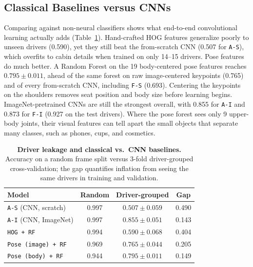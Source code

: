 \subsection{Classical Baselines versus CNNs}
\label{classical}
Comparing against non-neural classifiers shows what end-to-end convolutional learning actually adds (Table~\ref{tab:leakage_classical}). Hand-crafted HOG features generalize poorly to unseen drivers (0.590), yet they still beat the from-scratch CNN (0.507 for \texttt{A-S}), which overfits to cabin details when trained on only 14--15 drivers. Pose features do much better. A Random Forest on the 19 body-centered pose features reaches $0.795 \pm 0.011$, ahead of the same forest on raw image-centered keypoints (0.765) and of every from-scratch CNN, including \texttt{F-S} (0.693). Centering the keypoints on the shoulders removes seat position and body size before learning begins. ImageNet-pretrained CNNs are still the strongest overall, with 0.855 for \texttt{A-I} and 0.873 for \texttt{F-I} (0.927 on the test drivers). Where the pose forest sees only 9 upper-body joints, their visual features can tell apart the small objects that separate many classes, such as phones, cups, and cosmetics. 

\begin{table}[t]
  \centering
  \small
  \caption{\textbf{Driver leakage and classical vs.\ CNN baselines.} Accuracy
  on a random frame split versus 3-fold driver-grouped cross-validation; the gap quantifies
  inflation from seeing the same drivers in training and validation.}
  \label{tab:leakage_classical}
  \setlength{\tabcolsep}{4pt}
  \begin{tabular}{@{}lccc@{}}
    \toprule
    Model & Random & Driver-grouped & Gap \\
    \midrule
    \texttt{A-S} (CNN, scratch) & 0.997 & $0.507 \pm 0.059$ & 0.490 \\
    \texttt{A-I} (CNN, ImageNet) & 0.997 & $0.855 \pm 0.051$ & 0.143 \\
    \texttt{HOG + RF} & 0.994 & $0.590 \pm 0.068$ & 0.404 \\
    \texttt{Pose (image) + RF} & 0.969 & $0.765 \pm 0.044$ & 0.205 \\
    \texttt{Pose (body) + RF} & 0.944 & $0.795 \pm 0.011$ & 0.149 \\
    \bottomrule
  \end{tabular}
\end{table}

